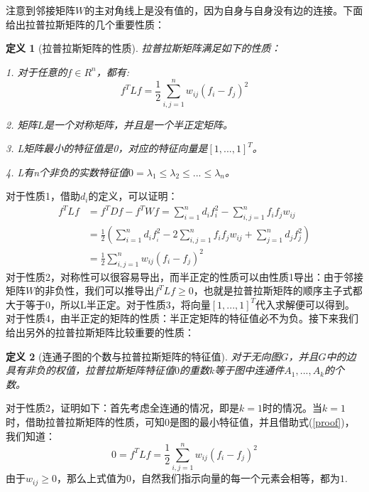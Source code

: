 \documentclass[UTF8, 12pt]{ctexart}
\newtheorem{thm}{定义}
\begin{document}
注意到邻接矩阵$W$的主对角线上是没有值的，因为自身与自身没有边的连接。下面给出拉普拉斯矩阵的几个重要性质：
\begin{thm}[拉普拉斯矩阵的性质]
	拉普拉斯矩阵满足如下的性质：
	
	1. 对于任意的$f \in {R^n}$，都有:
	\begin{equation}
	{f^T}Lf = \frac{1}{2}\sum\limits_{i,j = 1}^n {{w_{ij}}{{({f_i} - {f_j})}^2}}
	\label{proof}
	\end{equation}
	
	2. 矩阵$L$是一个对称矩阵，并且是一个半正定矩阵。
	
	3. L矩阵最小的特征值是0，对应的特征向量是${[1,...,1]^T}$。
	
	4. L有n个非负的实数特征值$0 = {\lambda _1} \le {\lambda _2} \le ... \le {\lambda _n}$。
\end{thm}

对于性质1，借助$d_i$的定义，可以证明：
\begin{align}
	{f^T}Lf &  = {f^T}Df - {f^T}Wf = \sum\limits_{i = 1}^n {{d_i}f_i^2}  - \sum\limits_{i,j = 1}^n {{f_i}{f_j}{w_{ij}}} \\
								  & = \frac{1}{2}(\sum\limits_{i = 1}^n {{d_i}f_{_i}^2 - 2\sum\limits_{i,j = 1}^n {{f_i}{f_j}{w_{ij}} + \sum\limits_{j = 1}^n {{d_j}f_j^2} } } )\\
								  & = \frac{1}{2}\sum\limits_{i,j = 1}^n {{w_{ij}}{{({f_i} - {f_j})}^2}} 
\end{align}
对于性质2，对称性可以很容易导出，而半正定的性质可以由性质1导出：由于邻接矩阵$W$的非负性，我们可以推导出${f^T}Lf \ge 0$，也就是拉普拉斯矩阵的顺序主子式都大于等于0，所以L半正定。对于性质3，将向量${[1,...,1]^T}$代入求解便可以得到。对于性质4，由半正定的矩阵的性质：半正定矩阵的特征值必不为负。接下来我们给出另外的拉普拉斯矩阵比较重要的性质：

\begin{thm}[连通子图的个数与拉普拉斯矩阵的特征值]
	对于无向图$G$，并且$G$中的边具有非负的权值，拉普拉斯矩阵特征值$0$的重数$k$等于图中连通件$A_1,...,A_k$的个数。
\end{thm}

对于性质2，证明如下：首先考虑全连通的情况，即是$k=1$时的情况。当$k=1$时，借助拉普拉斯矩阵的性质，可知$0$是图的最小特征值，并且借助式(\ref{proof})，我们知道：
\begin{equation}
	0 = {f^T}Lf = \frac{1}{2}\sum\limits_{i,j = 1}^n {{w_{ij}}{{({f_i} - {f_j})}^2}}
\end{equation}
由于$w_{ij} \ge 0$，那么上式值为$0$，自然我们指示向量的每一个元素会相等，都为$1$.
\end{document}
